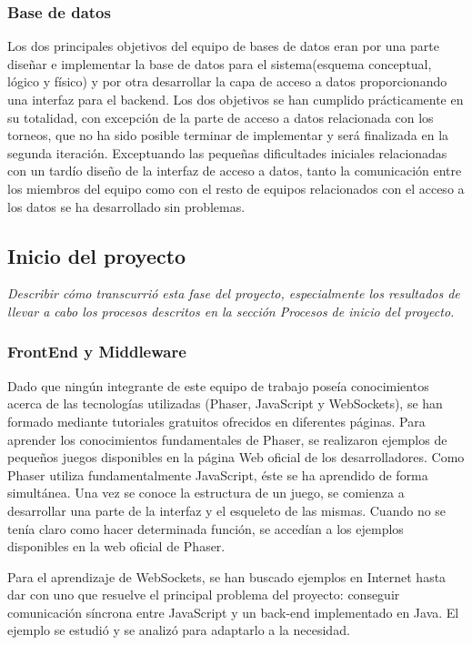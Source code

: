 \subsubsection*{Base de datos}
Los dos principales objetivos del equipo de bases de datos eran por una parte diseñar e implementar la base de datos para el sistema(esquema conceptual, lógico y físico) y por otra desarrollar la capa de acceso a datos proporcionando una interfaz para el backend. Los dos objetivos se han cumplido prácticamente en su totalidad, con excepción de la parte de acceso a datos relacionada con los torneos, que no ha sido posible terminar de implementar y será finalizada en la segunda iteración. Exceptuando las pequeñas dificultades iniciales relacionadas con un tardío diseño de la interfaz de acceso a datos, tanto la comunicación entre los miembros del equipo como con el resto de equipos relacionados con el acceso a los datos se ha desarrollado sin problemas.

\subsection{Inicio del proyecto}
\label{Inicio del proyecto}
\emph{Describir cómo transcurrió esta fase del proyecto, especialmente los resultados de llevar a cabo los procesos descritos en la sección Procesos de inicio del proyecto.}
\subsubsection*{FrontEnd y Middleware}
Dado que ningún integrante de este equipo de trabajo poseía conocimientos acerca de las tecnologías utilizadas (Phaser, JavaScript y WebSockets), se han formado mediante tutoriales gratuitos ofrecidos en diferentes páginas.
Para aprender los conocimientos fundamentales de Phaser, se realizaron ejemplos de pequeños juegos disponibles en la página Web oficial de los desarrolladores. Como Phaser utiliza fundamentalmente JavaScript, éste se ha aprendido de forma simultánea. Una vez se conoce la estructura de un juego, se comienza a desarrollar una parte de la interfaz y el esqueleto de las mismas. Cuando no se tenía claro como hacer determinada función, se accedían a los ejemplos disponibles en la web oficial de Phaser.

Para el aprendizaje de WebSockets, se han buscado ejemplos en Internet hasta dar con uno que resuelve el principal problema del proyecto: conseguir comunicación síncrona entre JavaScript y un back-end implementado en Java. El ejemplo se estudió y se analizó para adaptarlo a la necesidad.


